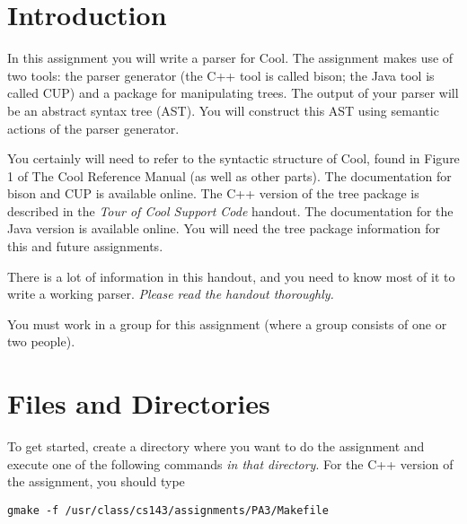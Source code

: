 \documentclass[11pt]{article}
\begin{document}

%
\def\U#1{{\sf{}#1}}
\def\S#1{{\tt{}#1}} %
\def\C#1{{\bf{}#1}}

\section{Introduction}

In this assignment you will write a parser for Cool. The assignment
makes use of two tools: the parser generator (the C++ tool is called
\U{bison}; the Java tool is called \U{CUP}) and a package for
manipulating trees. The output of your parser will be an abstract syntax
tree (AST). You will construct this AST using semantic actions of the
parser generator.

You certainly will need to refer to the syntactic structure of Cool,
found in Figure 1 of The Cool Reference Manual (as well as other parts).  
The documentation for \U{bison} and \U{CUP} is available
online.  The C++ version of the
tree package is described in the {\em Tour of Cool Support Code}
handout.  The documentation for the Java version is available online.
You will need the tree
package information for this and future assignments.

There is a lot of information in this handout, and you need to know
most of it to write a working parser.  {\em Please read the handout
thoroughly.}

You must work in a group for this assignment (where a group consists of
one or two people).

\section {Files and Directories}

To get started, create a directory where you want to do the assignment
and execute one of the following commands {\em in that directory}.  For
the C++ version of the assignment, you should type

\begin{verbatim}
gmake -f /usr/class/cs143/assignments/PA3/Makefile
\end{verbatim}
\end{document}
